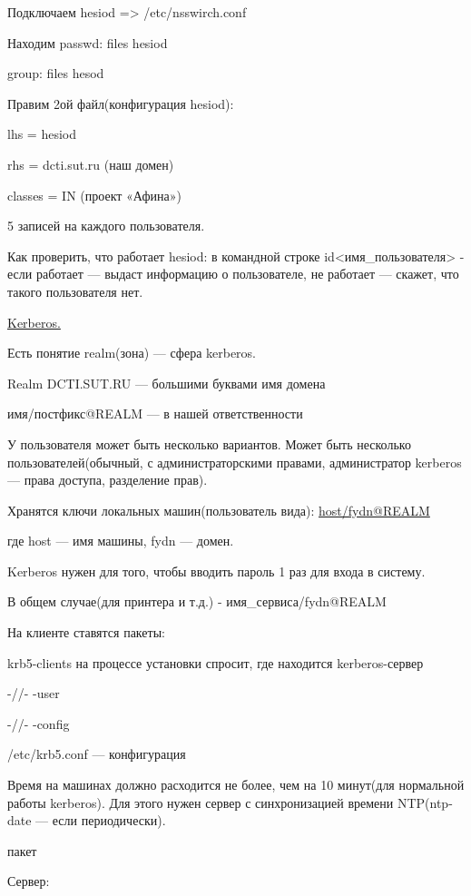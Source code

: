 \par 
Подключаем hesiod => /etc/nsswirch.conf
\par 
Находим passwd: files hesiod
\par 
	    group: files hesod
\par 
Правим 2ой файл(конфигурация hesiod):
\par 
lhs = hesiod
\par 
rhs = dcti.sut.ru (наш домен)
\par 
classes = IN (проект «Афина»)
\par 
5 записей на каждого пользователя.
\par 
Как проверить, что работает hesiod: в
командной строке id<имя\_пользователя>
- если работает — выдаст информацию о
пользователе, не работает — скажет, что
такого пользователя нет.
\par 
\underline{Kerberos.}
\par 
Есть понятие realm(зона) — сфера kerberos.
\par 
Realm DCTI.SUT.RU — большими буквами имя домена
\par 
имя/постфикс@REALM — в нашей ответственности
\par 
У пользователя может быть несколько
вариантов. Может быть несколько
пользователей(обычный, с администраторскими
правами, администратор kerberos — права
доступа, разделение прав).
\par Хранятся
ключи локальных машин(пользователь
вида): \underline{host/fydn@REALM}


\par 
где host — имя машины, fydn — домен.
\par 
Kerberos нужен для того, чтобы вводить пароль
1 раз для входа в систему.
\par 
В общем случае(для принтера и т.д.) -
имя\_сервиса/fydn@REALM
\par 
На клиенте ставятся пакеты:
\par 
krb5-clients		на процессе установки спросит,
где находится kerberos-сервер
\par 
-//- -user
\par 
-//- -config
\par 
/etc/krb5.conf — конфигурация
\par 
Время на машинах должно расходится не
более, чем на 10 минут(для нормальной
работы kerberos). Для этого нужен сервер с
синхронизацией времени NTP(ntp-date — если
периодически).
\par 
                                пакет
\par 
Сервер:

